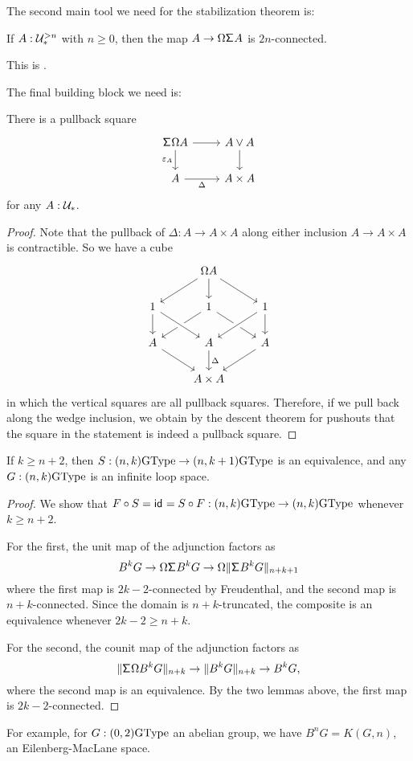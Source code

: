 The second main tool we need for the stabilization theorem is:
\begin{thm}[Freudenthal]
  If $A : \UU_\pt^{>n}$ with $n\ge 0$, then the map
  $A \to \Omega\susp A$ is $2n$-connected.
\end{thm}
This is \cite[Theorem~8.6.4]{hottbook}.

The final building block we need is:
\begin{lem}
  There is a pullback square
  \[
    \begin{tikzcd}
      \susp\Omega A \ar[d,"\varepsilon_A"']\ar[r] & A \vee A \ar[d] \\
      A \ar[r,"\Delta"'] & A \times A
    \end{tikzcd}
  \]
  for any $A : \UU_\pt$.
\end{lem}

\begin{proof}
Note that the pullback of $\Delta:A\to A\times A$ along either inclusion $A\to A\times A$ is contractible. So we have a cube
\begin{equation*}
\begin{tikzcd}
& \Omega A \arrow[dl] \arrow[d] \arrow[dr] \\
1 \arrow[d] & 1 \arrow[dl] \arrow[dr] & 1 \arrow[dl,crossing over] \arrow[d] \\
A \arrow[dr] & A \arrow[d,"\Delta"] \arrow[from=ul,crossing over] & A \arrow[dl] \\
& A\times A
\end{tikzcd}
\end{equation*}
in which the vertical squares are all pullback squares. Therefore, if we pull back along the wedge inclusion, we obtain by the descent theorem for pushouts that the square in the statement is indeed a pullback square.
\end{proof}

\begin{thm}[Stabilization]
  \label{thm:stabilization}
  If $k\ge n+2$, then $S : (n,k)\GType \to (n,k+1)\GType$ is an
  equivalence, and any $G : (n,k)\GType$ is an infinite loop space.
\end{thm}
\begin{proof}
  We show that $F\circ S=\idfunc=S\circ F : (n,k)\GType \to (n,k)\GType$
  whenever $k\ge n+2$.

  For the first, the unit map of the adjunction factors as
  \[
    B^kG \to \Omega\susp B^kG \to \Omega\trunc{n+k+1}{\susp B^kG}
  \]
  where the first map is $2k-2$-connected by Freudenthal, and the
  second map is $n+k$-connected. Since the domain is $n+k$-truncated,
  the composite is an equivalence whenever $2k-2 \ge n+k$.

  For the second, the counit map of the adjunction factors as
  \[
    \trunc{n+k}{\susp\Omega B^kG} \to \trunc{n+k}{B^kG} \to B^kG,
  \]
  where the second map is an equivalence. By the two lemmas above, the
  first map is $2k-2$-connected.
\end{proof}
For example, for $G : (0,2)\GType$ an abelian group, we have
$B^nG = K(G,n)$, an Eilenberg-MacLane space.

